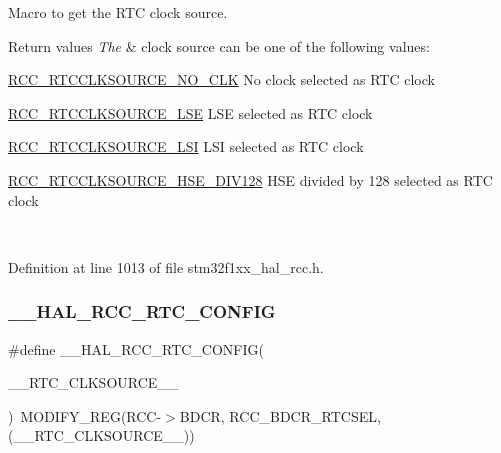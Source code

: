 Macro to get the R\+TC clock source. 


\begin{DoxyRetVals}{Return values}
{\em The} & clock source can be one of the following values\+: \begin{DoxyItemize}
\item \hyperlink{group___r_c_c___r_t_c___clock___source_gacce0b2f54d103340d8c3a218e86e295d}{R\+C\+C\+\_\+\+R\+T\+C\+C\+L\+K\+S\+O\+U\+R\+C\+E\+\_\+\+N\+O\+\_\+\+C\+LK} No clock selected as R\+TC clock \item \hyperlink{group___r_c_c___r_t_c___clock___source_ga5dca8d63f250a20bd6bc005670d0c150}{R\+C\+C\+\_\+\+R\+T\+C\+C\+L\+K\+S\+O\+U\+R\+C\+E\+\_\+\+L\+SE} L\+SE selected as R\+TC clock \item \hyperlink{group___r_c_c___r_t_c___clock___source_gab47a1afb8b5eef9f20f4772961d0a5f4}{R\+C\+C\+\_\+\+R\+T\+C\+C\+L\+K\+S\+O\+U\+R\+C\+E\+\_\+\+L\+SI} L\+SI selected as R\+TC clock \item \hyperlink{group___r_c_c___r_t_c___clock___source_ga7e022374ec3ceffa94e5bb6310c35c83}{R\+C\+C\+\_\+\+R\+T\+C\+C\+L\+K\+S\+O\+U\+R\+C\+E\+\_\+\+H\+S\+E\+\_\+\+D\+I\+V128} H\+SE divided by 128 selected as R\+TC clock \end{DoxyItemize}
\\
\hline
\end{DoxyRetVals}


Definition at line 1013 of file stm32f1xx\+\_\+hal\+\_\+rcc.\+h.

\mbox{\label{group___r_c_c___r_t_c___clock___configuration_ga2d6c4c7e951bfd007d26988fbfe6eaa4}} 
\subsubsection{\texorpdfstring{\+\_\+\+\_\+\+H\+A\+L\+\_\+\+R\+C\+C\+\_\+\+R\+T\+C\+\_\+\+C\+O\+N\+F\+IG}{\_\_HAL\_RCC\_RTC\_CONFIG}}
{\footnotesize\ttfamily \#define \+\_\+\+\_\+\+H\+A\+L\+\_\+\+R\+C\+C\+\_\+\+R\+T\+C\+\_\+\+C\+O\+N\+F\+IG(\begin{DoxyParamCaption}\item[{}]{\+\_\+\+\_\+\+R\+T\+C\+\_\+\+C\+L\+K\+S\+O\+U\+R\+C\+E\+\_\+\+\_\+ }\end{DoxyParamCaption})~M\+O\+D\+I\+F\+Y\+\_\+\+R\+EG(R\+CC-\/$>$B\+D\+CR, R\+C\+C\+\_\+\+B\+D\+C\+R\+\_\+\+R\+T\+C\+S\+EL, (\+\_\+\+\_\+\+R\+T\+C\+\_\+\+C\+L\+K\+S\+O\+U\+R\+C\+E\+\_\+\+\_\+))}



